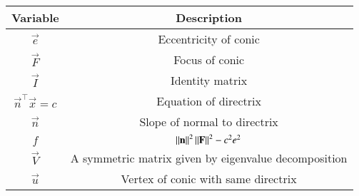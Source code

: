 \begin{tabular}[12pt]{ |c| c|}
    \hline
    \textbf{Variable} & \textbf{Description}\\ 
    \hline
	$\vec{e}$ & Eccentricity of conic\\
	\hline
	$\vec{F}$ & Focus of conic\\
	\hline
	$\vec{I}$ & Identity matrix\\
	\hline
	$\vec{n}^{\top}\vec{x}=c$ & Equation of directrix\\
	\hline
	$\vec{n}$ & Slope of normal to directrix\\
	\hline
	$f$ & $\left\lVert\mathbf{n}\right\rVert^2\left\lVert\mathbf{F}\right\rVert^2-c^2e^2$\\
	\hline
	$\vec{V}$ & A symmetric matrix given by eigenvalue decomposition\\
	\hline
	$\vec{u}$ & Vertex of conic with same directrix\\
	\hline
\end{tabular}
